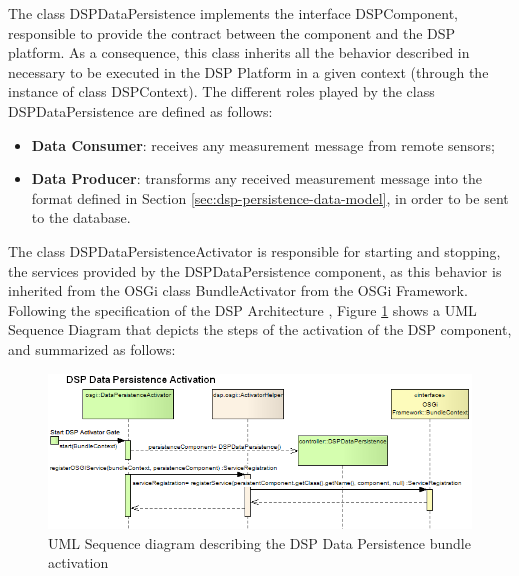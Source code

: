 The class DSPDataPersistence implements the interface DSPComponent, responsible
to provide the contract between the component and the DSP platform. As a
consequence, this class inherits all the behavior described in
\cite{netbeams-dsp-architecture} necessary to be executed in the DSP Platform
in a given context (through the instance of class DSPContext). The different
roles played by the class DSPDataPersistence are defined as follows:

\begin{itemize}
  \item \textbf{Data Consumer}: receives any measurement message from remote
  sensors;
  \item \textbf{Data Producer}: transforms any received measurement message
  into the format defined in Section \ref{sec:dsp-persistence-data-model}, in
  order to be sent to the database.
\end{itemize}

The class DSPDataPersistenceActivator is responsible for starting and stopping,
the services provided by the DSPDataPersistence component, as this behavior is
inherited from the OSGi class BundleActivator from the OSGi Framework. Following
the specification of the DSP Architecture \cite{netbeams-dsp-architecture},
Figure
\ref{fig:From-OSGi-Framework-to-DSP-Data-PersistenceActivator-Sequence-Diagram} 
shows a UML Sequence Diagram that depicts the steps of the activation of the
DSP component, and summarized as follows:

\begin{figure}[!h]
  \centering
  \includegraphics[scale=0.65]{../diagrams/From-OSGi-Framework-to-DSP-Data-PersistenceActivator-Sequence-Diagram}
  \caption{UML Sequence diagram describing the DSP Data Persistence bundle activation}
  \label{fig:From-OSGi-Framework-to-DSP-Data-PersistenceActivator-Sequence-Diagram}
\end{figure}

